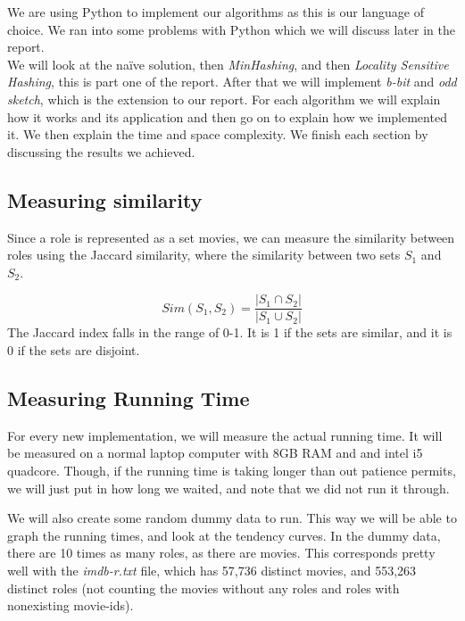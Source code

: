 \documentclass[a4paper,11pt]{article}
\begin{document}
We are using Python to implement our algorithms as this is our language of choice. We ran into some problems with Python which we will discuss later in the report.\\

We will look at the naïve solution, then \emph{MinHashing}, and then \emph{Locality Sensitive Hashing}, this is part one of the report. After that we will implement \emph{b-bit} and \emph{odd sketch}, which is the extension to our report. For each algorithm we will explain how it works and its application and then go on to explain how we implemented it. We then explain the time and space complexity. We finish each section by discussing the results we achieved.\\




\subsection{Measuring similarity}
Since a role is represented as a set movies, we can measure the similarity between roles using the Jaccard similarity, where the similarity between two sets $S_1$ and $S_2$.

\begin{equation}
Sim(S_1, S_2) = \frac{|S_1 \cap S_2|}{|S_1 \cup S_2|}
\end{equation}
The Jaccard index falls in the range of 0-1. It is 1 if the sets are similar, and it is 0 if the sets are disjoint.


\subsection{Measuring Running Time}

For every new implementation, we will measure the actual running time. It will be measured on a normal laptop computer with 8GB RAM and and intel i5 quadcore. Though, if the running time is taking longer than out patience permits, we will just put in how long we waited, and note that we did not run it through.

We will also create some random dummy data to run. This way we will be able to graph the running times, and look at the tendency curves. In the dummy data, there are 10 times as many roles, as there are movies. This corresponds pretty well with the \emph{imdb-r.txt} file, which has 57,736 distinct movies, and 553,263 distinct roles (not counting the movies without any roles and roles with nonexisting movie-ids).
\end{document}
